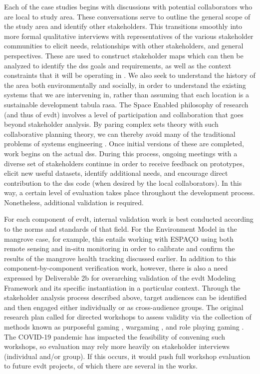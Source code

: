 \documentclass[notitlepage]{article}
\begin{document}
Each of the case studies begins with discussions with potential collaborators who are local to study area. These conversations serve to outline the general scope of the study area and identify other stakeholders. This transitions smoothly into more formal qualitative interviews with representatives of the various stakeholder communities to elicit needs, relationships with other stakeholders, and general perspectives. These are used to construct stakeholder maps which can then be analyzed to identify the \ac{dss} goals and requirements, as well as the context constraints that it will be operating in \cite{crawleySystemArchitectureStrategy2015, woodBuildingTechnologicalCapability2012}. We also seek to understand the history of the area both environmentally and socially, in order to understand the existing systems that we are intervening in, rather than assuming that each location is a sustainable development tabula rasa. The Space Enabled philosophy of research (and thus of \ac{evdt}) involves a level of participation and collaboration that goes beyond stakeholder analysis. By paring complex \ac{sets} theory with such collaborative planning theory, we can thereby avoid many of the traditional problems of systems engineering \cite{goodspeedScenarioPlanningCities2020}. Once initial versions of these are completed, work begins on the actual \ac{dss}. During this process, ongoing meetings with a diverse set of stakeholders continue in order to receive feedback on prototypes, elicit new useful datasets, identify additional needs, and encourage direct contribution to the \ac{dss} code (when desired by the local collaborators). In this way, a certain level of evaluation takes place throughout the development process. Nonetheless, additional validation is required.

For each component of \ac{evdt}, internal validation work is best conducted according to the norms and standards of that field. For the Environment Model in the mangrove case, for example, this entails working with ESPAÇO using both remote sensing and in-situ monitoring in order to calibrate and confirm the results of the mangrove health tracking discussed earlier. In addition to this component-by-component verification work, however, there is also a need expressed by Deliverable 2b for overarching validation of the \ac{evdt} Modeling Framework and its specific instantiation in a particular context. Through the stakeholder analysis process described above, target audiences can be identified and then engaged either individually or as cross-audience groups. The original research plan called for directed workshops to assess validity via the collection of methods known as purposeful gaming \cite{rossGamebasedLearningSystems2014}, wargaming \cite{hansonImprovingOperationalWargaming2016,selvaRevitalizingWargamingNecessary15,shlapakReinforcingDeterrenceNATO2016}, and role playing gaming \cite{groganStrategicEngineeringGaming2012,groganFederatedSimulationGaming2012}. The COVID-19 pandemic has impacted the feasibility of convening such workshops, so evaluation may rely more heavily on stakeholder interviews (individual and/or group). If this occurs, it would push full workshop evaluation to future \ac{evdt} projects, of which there are several in the works. 
\end{document}
